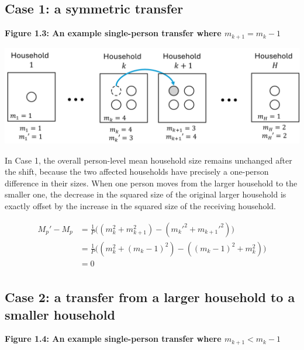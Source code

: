 \documentclass[
]{article}
\begin{document}
\hypertarget{case-1-a-symmetric-transfer}{%
\subsection{Case 1: a symmetric
transfer}\label{case-1-a-symmetric-transfer}}

\textbf{Figure 1.3: An example single-person transfer where
\(m_{k+1} = m_k - 1\)}

\includegraphics[width=1\linewidth]{proof_files/figure1-3}

In Case 1, the overall person-level mean household size remains
unchanged after the shift, because the two affected households have
precisely a one-person difference in their sizes. When one person moves
from the larger household to the smaller one, the decrease in the
squared size of the original larger household is exactly offset by the
increase in the squared size of the receiving household.

\begin{align}
M_p' - M_p & = \frac{1}{P} \bigg( (m_k^2 + m_{k+1}^2) - (m_k'^2 + m_{k+1}'^2) \bigg) \\
& = \frac{1}{P} \bigg( (m_k^2 + (m_k - 1)^2) - ((m_k-1)^2 + m_k^2) \bigg)\\
& = 0 \\
\end{align}

\hypertarget{case-2-a-transfer-from-a-larger-household-to-a-smaller-household}{%
\subsection{Case 2: a transfer from a larger household to a smaller
household}\label{case-2-a-transfer-from-a-larger-household-to-a-smaller-household}}

\textbf{Figure 1.4: An example single-person transfer where
\(m_{k+1} < m_k - 1\)}
\end{document}
